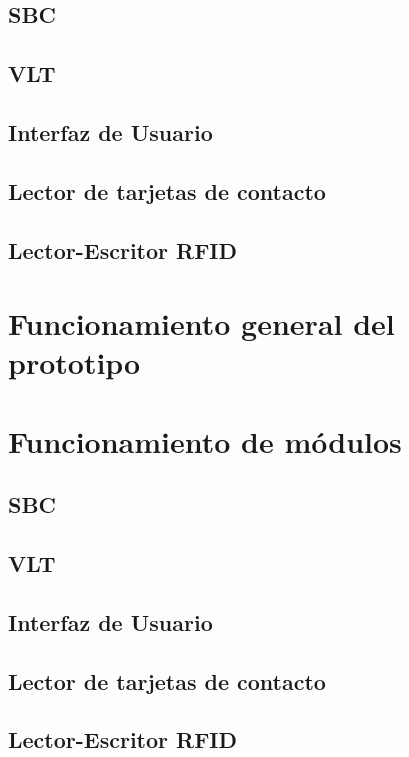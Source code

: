 \subsection{SBC}
\subsection{VLT}
\subsection{Interfaz de Usuario}
\subsection{Lector de tarjetas de contacto}
\subsection{Lector-Escritor RFID}

\section{Funcionamiento general del prototipo}

\section{Funcionamiento de m\'odulos}
\subsection{SBC}
\subsection{VLT}
\subsection{Interfaz de Usuario}
\subsection{Lector de tarjetas de contacto}
\subsection{Lector-Escritor RFID}